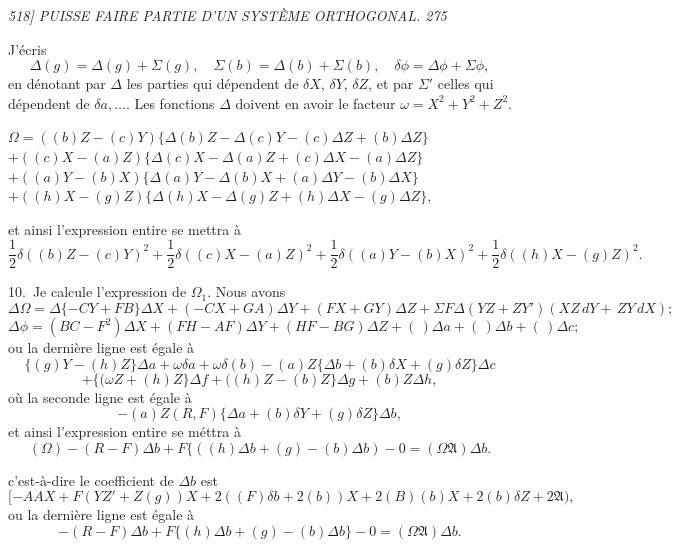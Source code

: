 \documentclass[11pt,a4paper]{book}
\begin{document}
\clearpage

\noindent\textit{518] \hfill PUISSE FAIRE PARTIE D'UN SYST\`EME ORTHOGONAL. \hfill 275}

\medskip

J'\'ecris
\[
\Delta(g) = \Delta(g) + \Sigma(g), \quad \Sigma(b) = \Delta(b) + \Sigma(b), \quad \delta\phi = \Delta\phi + \Sigma\phi,
\]
en d\'enotant par $\Delta$ les parties qui d\'ependent de $\delta X$, $\delta Y$, $\delta Z$, et par $\Sigma'$ celles qui
d\'ependent de $\delta a, \ldots$. Les fonctions $\Delta$ doivent en avoir le facteur $\omega = X^2 + Y^2 + Z^2$.

\medskip

\quad $\Omega = ((b)Z - (c)Y)\{\Delta(b)Z - \Delta(c)Y - (c)\Delta Z + (b)\Delta Z\}$\\
\quad \quad $+ ((c)X - (a)Z)\{\Delta(c)X - \Delta(a)Z + (c)\Delta X - (a)\Delta Z\}$\\
\quad \quad $+ ((a)Y - (b)X)\{\Delta(a)Y - \Delta(b)X + (a)\Delta Y - (b)\Delta X\}$\\
\quad \quad $+ ((h)X - (g)Z)\{\Delta(h)X - \Delta(g)Z + (h)\Delta X - (g)\Delta Z\}$,

et ainsi l'expression entire se mettra \`a
\[
\frac{1}{2}\delta((b)Z - (c)Y)^2 + \frac{1}{2}\delta((c)X - (a)Z)^2 + \frac{1}{2}\delta((a)Y - (b)X)^2 + \frac{1}{2}\delta((h)X - (g)Z)^2.
\]

10.~Je calcule l'expression de $\Omega_1$. Nous avons
\[
\Delta\Omega = \Delta\{- CY + FB\}\Delta X + (-CX + GA)\Delta Y + (FX + GY)\Delta Z + \Sigma F\Delta(YZ + ZY')(XZ \, dY + \, ZY \, dX);
\]
\[
\Delta\phi = (BC - F^2)\Delta X + (FH - AF)\Delta Y + (HF - BG)\Delta Z + ( \, )\Delta a + ( \, )\Delta b + ( \, )\Delta c;
\]
ou la derni\`ere ligne est \'egale \`a
\[
\{(g)Y - (h)Z\}\Delta a + \omega \delta a + \omega \delta(b) - (a)Z\{\Delta b + (b)\delta X + (g)\delta Z\}\Delta c
\]
\[
+ \{(\omega Z + (h)Z\}\Delta f + ((h)Z - (b)Z\}\Delta g + (b)Z \Delta h ,
\]
o\`u la seconde ligne est \'egale \`a
\[
- (a)Z(R, F)\{\Delta a + (b)\delta Y + (g)\delta Z\}\Delta b ,
\]
et ainsi l'expression entire se m\'ettra \`a
\[
(\Omega) - (R - F)\Delta b + F\{((h)\Delta b + (g) - (b)\Delta b ) - 0 = (\Omega \mathfrak{A})\Delta b.
\]

c'est-\`a-dire le coefficient de $\Delta b$ est
\[
[-AAX + F(YZ' + Z(g))X + 2((F)\delta b + 2(b))X + 2(B)(b)X + 2(b)\delta Z + 2 \mathfrak{A} ),
\]
ou la derni\`ere ligne est \'egale \`a
\[
- (R - F)\Delta b + F\{(h)\Delta b + (g) - (b)\Delta b\} - 0 = (\Omega \mathfrak{A})\Delta b.
\]
\end{document}
